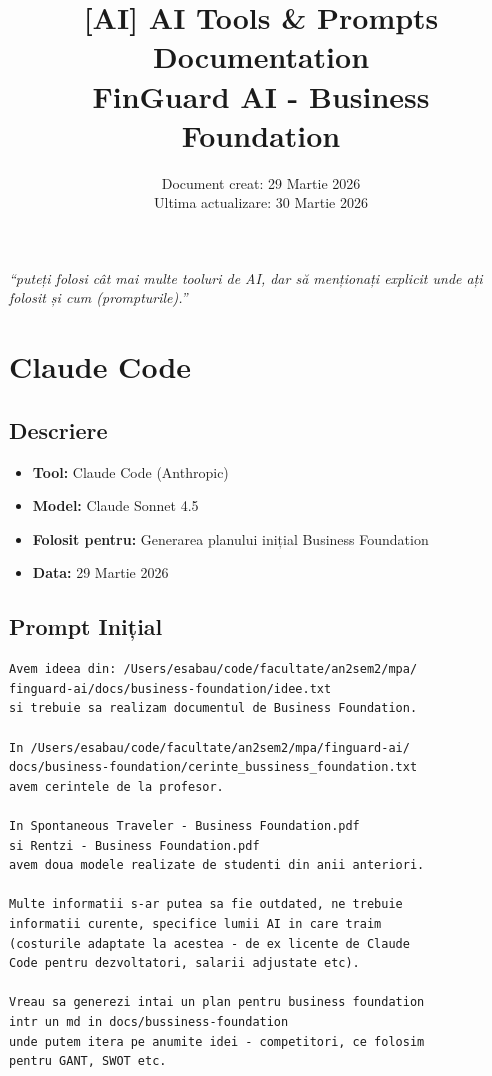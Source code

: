 \documentclass[11pt,a4paper]{article}
\title{\textbf{[AI] AI Tools \& Prompts Documentation}\\
\large FinGuard AI - Business Foundation}
\author{}
\date{Document creat: 29 Martie 2026\\
Ultima actualizare: 30 Martie 2026}
\begin{document}
\maketitle

\begin{tcolorbox}[colback=yellow!10!white,colframe=orange!75!black,title=Cerință Profesor]
\textit{``puteți folosi cât mai multe tooluri de AI, dar să menționați explicit unde ați folosit și cum (prompturile).''}
\end{tcolorbox}

\tableofcontents
\newpage

\section{Claude Code}

\subsection{Descriere}
\begin{itemize}[leftmargin=*]
    \item \textbf{Tool:} Claude Code (Anthropic)
    \item \textbf{Model:} Claude Sonnet 4.5
    \item \textbf{Folosit pentru:} Generarea planului inițial Business Foundation
    \item \textbf{Data:} 29 Martie 2026
\end{itemize}

\subsection{Prompt Inițial}

\begin{tcolorbox}[colback=promptbackground,colframe=blue!75!black,title=Prompt Input]
\begin{verbatim}
Avem ideea din: /Users/esabau/code/facultate/an2sem2/mpa/
finguard-ai/docs/business-foundation/idee.txt
si trebuie sa realizam documentul de Business Foundation.

In /Users/esabau/code/facultate/an2sem2/mpa/finguard-ai/
docs/business-foundation/cerinte_bussiness_foundation.txt
avem cerintele de la profesor.

In Spontaneous Traveler - Business Foundation.pdf
si Rentzi - Business Foundation.pdf
avem doua modele realizate de studenti din anii anteriori.

Multe informatii s-ar putea sa fie outdated, ne trebuie
informatii curente, specifice lumii AI in care traim
(costurile adaptate la acestea - de ex licente de Claude
Code pentru dezvoltatori, salarii adjustate etc).

Vreau sa generezi intai un plan pentru business foundation
intr un md in docs/bussiness-foundation
unde putem itera pe anumite idei - competitori, ce folosim
pentru GANT, SWOT etc.
\end{verbatim}
\end{tcolorbox}
\end{document}
